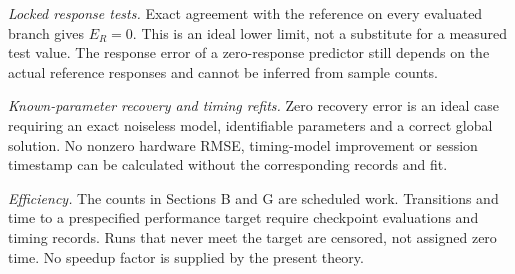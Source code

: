 \documentclass[letterpaper,10pt,conference]{ieeeconf}
\newcommand{\ER}{E_R}
\begin{document}
\emph{Locked response tests.} Exact agreement with the reference on every evaluated branch gives $\ER=0$. This is an ideal lower limit, not a substitute for a measured test value. The response error of a zero-response predictor still depends on the actual reference responses and cannot be inferred from sample counts.

\emph{Known-parameter recovery and timing refits.} Zero recovery error is an ideal case requiring an exact noiseless model, identifiable parameters and a correct global solution. No nonzero hardware RMSE, timing-model improvement or session timestamp can be calculated without the corresponding records and fit.

\emph{Efficiency.} The counts in Sections B and G are scheduled work. Transitions and time to a prespecified performance target require checkpoint evaluations and timing records. Runs that never meet the target are censored, not assigned zero time. No speedup factor is supplied by the present theory.
\end{document}
